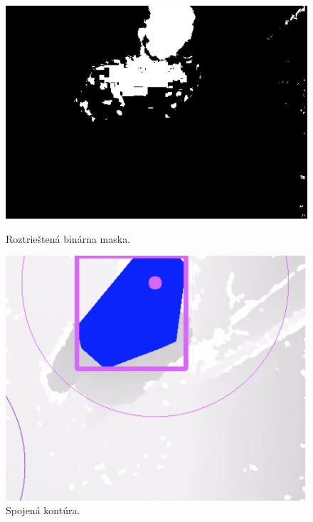\begin{figure}[H]
  \centering
  \begin{minipage}[b]{0.45\textwidth}
    \includegraphics[width=\textwidth]{images/destroyMask}
    \caption{Roztrieštená binárna maska.}
    \label{sec:binary_mask}
  \end{minipage}
  \hfill
  \begin{minipage}[b]{0.4\textwidth}
    \includegraphics[width=\textwidth]{images/connectMask}
    \caption{Spojená kontúra.}
  \end{minipage}
\end{figure}


